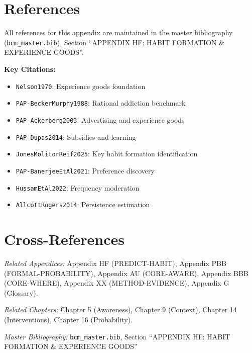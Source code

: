 \documentclass[11pt, a4paper]{article}
\begin{document}
\section{References}
\label{sec:lrn-references}

All references for this appendix are maintained in the master bibliography (\texttt{bcm\_master.bib}), Section ``APPENDIX HF: HABIT FORMATION \& EXPERIENCE GOODS''.

\textbf{Key Citations:}
\begin{itemize}[nosep]
    \item \texttt{Nelson1970}: Experience goods foundation
    \item \texttt{PAP-BeckerMurphy1988}: Rational addiction benchmark
    \item \texttt{PAP-Ackerberg2003}: Advertising and experience goods
    \item \texttt{PAP-Dupas2014}: Subsidies and learning
    \item \texttt{JonesMolitorReif2025}: Key habit formation identification
    \item \texttt{PAP-BanerjeeEtAl2021}: Preference discovery
    \item \texttt{HussamEtAl2022}: Frequency moderation
    \item \texttt{AllcottRogers2014}: Persistence estimation
\end{itemize}


\section{Cross-References}
\label{sec:lrn-crossref}

\noindent\textit{Related Appendices:}
Appendix HF (PREDICT-HABIT),
Appendix PBB (FORMAL-PROBABILITY),
Appendix AU (CORE-AWARE),
Appendix BBB (CORE-WHERE),
Appendix XX (METHOD-EVIDENCE),
Appendix G (Glossary).

\noindent\textit{Related Chapters:}
Chapter 5 (Awareness),
Chapter 9 (Context),
Chapter 14 (Interventions),
Chapter 16 (Probability).

\noindent\textit{Master Bibliography:} \texttt{bcm\_master.bib}, Section ``APPENDIX HF: HABIT FORMATION \& EXPERIENCE GOODS''

\nocite{bcm_master}

\end{document}
